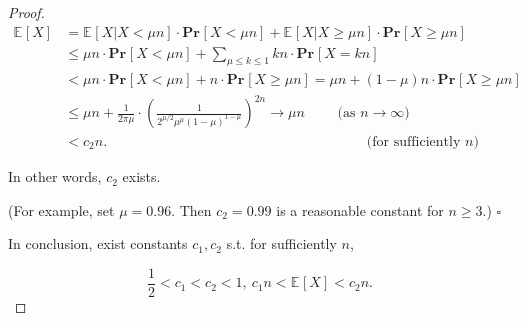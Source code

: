 \documentclass{article}
\renewcommand{\Pr}[2]{\mathbf{Pr}_{#1}\left[#2\right]}
\newcommand{\staExp}[2]{\mathbb{E}_{#1}\left[#2\right]}
\newcommand{\whiteqed}{\hfill $\square$\par}
\begin{document}
\begin{proof}
    \vspace{-2.7em}
    \begin{align*}
        \staExp{}{X} &=\staExp{}{X | X<\mu n}\cdot\Pr{}{X<\mu n}+\staExp{}{X | X\geq \mu n}\cdot\Pr{}{X\geq \mu n} \\
        &\le \mu n\cdot\Pr{}{X<\mu n} + \sum_{\mu \le k\le 1}kn\cdot\Pr{}{X=kn} \\
        &< \mu n\cdot\Pr{}{X<\mu n} + n\cdot\Pr{}{X\geq \mu n} = \mu n + (1-\mu)n\cdot\Pr{}{X\geq\mu n} \\
        &\le \mu n + \frac{1}{2\pi\mu}\cdot\left(\frac{1}{2^{\mu/2} \mu^\mu (1-\mu)^{1-\mu}}\right)^{2n} \rightarrow \mu n\qquad \text{ (as $n\rightarrow\infty$)} \\
        &< c_2 n.\qquad\qquad\qquad\qquad\qquad\qquad\qquad\qquad\qquad\ \text{ (for sufficiently $n$)}
    \end{align*}
    
    \vspace{-1em} \hspace{1.3em}
    In other words, $c_2$ exists.
    
    \hspace{1.3em}
    (For example, set $\mu=0.96.$ Then $c_2=0.99$ is a reasonable constant for $n\geq3 $.) \whiteqed
    
    \vspace{3em} \hspace{1.3em}
    In conclusion, exist constants $c_1,c_2$ s.t. for sufficiently $n$,
    
    \vspace{-1.2em}
    $$\frac{1}{2}<c_1<c_2<1,\ c_1n<\staExp{}{X}<c_2n.$$
    
    \vspace{-2.7em}
\end{proof}

\newpage
\vspace{2em}
\end{document}
